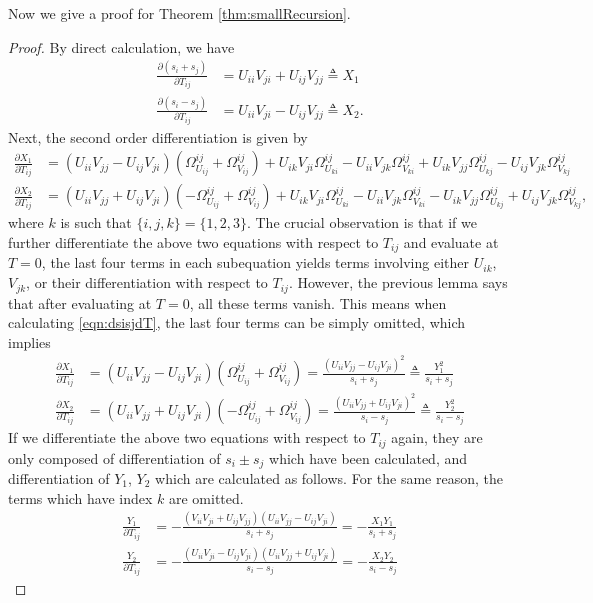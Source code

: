 \documentclass[10pt]{article}
\begin{document}
Now we give a proof for Theorem \ref{thm:smallRecursion}.
\begin{proof}
	By direct calculation, we have
	\begin{align*}
		\frac{\partial (s_i+s_j)}{\partial T_{ij}} &= U_{ii}V_{ji} + U_{ij}V_{jj} \triangleq X_1 \\
		\frac{\partial (s_i-s_j)}{\partial T_{ij}} &= U_{ii}V_{ji} - U_{ij}V_{jj} \triangleq X_2.
	\end{align*}
	Next, the second order differentiation is given by
	\begin{align*}
		\frac{\partial X_1}{\partial T_{ij}}
		&= (U_{ii}V_{jj}-U_{ij}V_{ji})(\Omega_{U_{ij}}^{ij}+\Omega_{V_{ij}}^{ij}) + U_{ik}V_{ji}\Omega_{U_{ki}}^{ij} - U_{ii}V_{jk}\Omega_{V_{ki}}^{ij} + U_{ik}V_{jj}\Omega_{U_{kj}}^{ij} - U_{ij}V_{jk}\Omega_{V_{kj}}^{ij} \\
		\frac{\partial X_2}{\partial T_{ij}} &= (U_{ii}V_{jj}+U_{ij}V_{ji})(-\Omega_{U_{ij}}^{ij}+\Omega_{V_{ij}}^{ij}) + U_{ik}V_{ji}\Omega_{U_{ki}}^{ij} - U_{ii}V_{jk}\Omega_{V_{ki}}^{ij} - U_{ik}V_{jj}\Omega_{U_{kj}}^{ij} + U_{ij}V_{jk}\Omega_{V_{kj}}^{ij},
	\end{align*}
	where $k$ is such that $\{i,j,k\} = \{1,2,3\}$.
	The crucial observation is that if we further differentiate the above two equations with respect to $T_{ij}$ and evaluate at $T=0$, the last four terms in each subequation yields terms involving either $U_{ik}$, $V_{jk}$, or their differentiation with respect to $T_{ij}$.
	However, the previous lemma says that after evaluating at $T=0$, all these terms vanish.
	This means when calculating \eqref{eqn:dsisjdT}, the last four terms can be simply omitted, which implies
	\begin{align*}
		\frac{\partial X_1}{\partial T_{ij}} &= (U_{ii}V_{jj}-U_{ij}V_{ji})(\Omega_{U_{ij}}^{ij}+\Omega_{V_{ij}}^{ij}) = \frac{(U_{ii}V_{jj}-U_{ij}V_{ji})^2}{s_i+s_j} \triangleq \frac{Y_1^2}{s_i+s_j} \\
		\frac{\partial X_2}{\partial T_{ij}} &= (U_{ii}V_{jj}+U_{ij}V_{ji})(-\Omega_{U_{ij}}^{ij}+\Omega_{V_{ij}}^{ij}) = \frac{(U_{ii}V_{jj}+U_{ij}V_{ji})^2}{s_i-s_j} \triangleq \frac{Y_2^2}{s_i-s_j}
	\end{align*}
	If we differentiate the above two equations with respect to $T_{ij}$ again, they are only composed of differentiation of $s_i \pm s_j$ which have been calculated, and differentiation of $Y_1$, $Y_2$ which are calculated as follows.
	For the same reason, the terms which have index $k$ are omitted.
	\begin{align*}
		\frac{Y_1}{\partial T_{ij}} &= -\frac{(V_{ii}V_{ji}+U_{ij}V_{jj})(U_{ii}V_{jj}-U_{ij}V_{ji})}{s_i+s_j} = -\frac{X_1Y_1}{s_i+s_j} \\
		\frac{Y_2}{\partial T_{ij}} &= -\frac{(U_{ii}V_{ji}-U_{ij}V_{ji})(U_{ii}V_{jj}+U_{ij}V_{ji})}{s_i-s_j} = -\frac{X_2Y_2}{s_i-s_j}
	\end{align*}
	

\end{proof}
\end{document}
